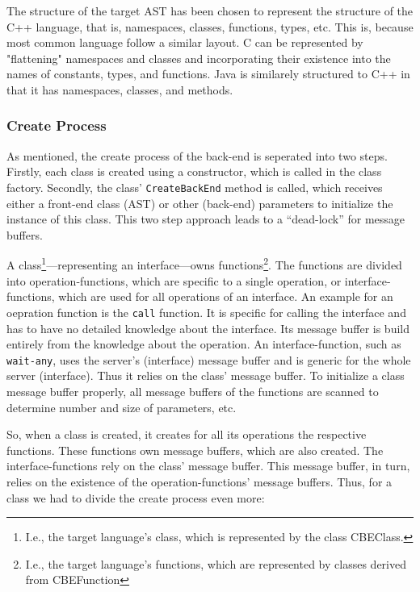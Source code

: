 The structure of the target AST has been chosen to represent the
structure of the C++ language, that is, namespaces, classes, functions,
types, etc.  This is, because most common language follow a similar 
layout.  C can be represented by "flattening" namespaces and classes
and incorporating their existence into the names of constants, types,
and functions.  Java is similarely structured to C++ in that it has
namespaces, classes, and methods.

\subsubsection{Create Process}
As mentioned, the create process of the back-end is seperated into
two steps.  Firstly, each class is created using a constructor, which
is called in the class factory.  Secondly, the class' \verb|CreateBackEnd|
method is called, which receives either a front-end class (AST) or
other (back-end) parameters to initialize the instance of this class.
This two step approach leads to a ``dead-lock'' for message buffers.

A class\footnote{I.e., the target language's class, which is represented
by the class CBEClass.}---representing an interface---owns 
functions\footnote{I.e., the target language's functions, which are
represented by classes derived from CBEFunction}.  The functions are
divided into operation-functions, which are specific to a single operation,
or interface-functions, which are used for all operations of an interface.
An example for an oepration function is the \verb|call| function.  It
is specific for calling the interface and has to have no detailed knowledge
about the interface.  Its message buffer is build entirely from the
knowledge about the operation.  An interface-function, such as \verb|wait-any|,
uses the server's (interface) message buffer and is generic for the whole
server (interface).  Thus it relies on the class' message buffer.  To
initialize a class message buffer properly, all message buffers of the 
functions are scanned to determine number and size of parameters, etc.

So, when a class is created, it creates for all its operations the 
respective functions.  These functions own message buffers, which are
also created.  The interface-functions rely on the class' message buffer.
This message buffer, in turn, relies on the existence of the 
operation-functions' message buffers.  Thus, for a class we had to
divide the create process even more:

